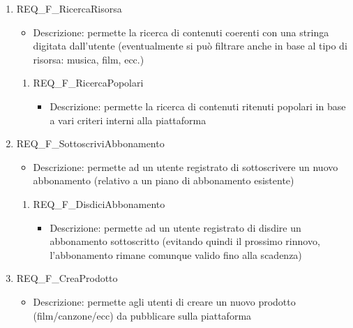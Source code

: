 \begin{enumerate}
	\item REQ\_F\_RicercaRisorsa
		\begin{itemize}	
			\item Descrizione: permette la ricerca di contenuti coerenti con una stringa digitata dall'utente (eventualmente si può filtrare anche in base al tipo di risorsa: musica, film, ecc.)
		\end{itemize}
		\begin{enumerate}[label*=\arabic*.]
			\item REQ\_F\_RicercaPopolari
			\begin{itemize}
				\item Descrizione: permette la ricerca di contenuti ritenuti popolari in base a vari criteri interni alla piattaforma 
			\end{itemize}	
		\end{enumerate}		

	\item REQ\_F\_SottoscriviAbbonamento
		\begin{itemize}	
			\item Descrizione: permette ad un utente registrato di sottoscrivere un nuovo abbonamento (relativo a un piano di abbonamento esistente)
		\end{itemize}
		\begin{enumerate}[label*=\arabic*.]			
		\item REQ\_F\_DisdiciAbbonamento
			\begin{itemize}	
				\item Descrizione: permette ad un utente registrato di disdire un abbonamento sottoscritto (evitando quindi il prossimo rinnovo, l'abbonamento rimane comunque valido fino alla scadenza)
			\end{itemize}
		\end{enumerate}
	
	
	\item REQ\_F\_CreaProdotto
	\begin{itemize}
		\item Descrizione: permette agli utenti di creare un nuovo prodotto (film/canzone/ecc) da pubblicare sulla piattaforma
	\end{itemize}
	\begin{enumerate}[label*=\arabic*.]
		

\end{enumerate}
\end{enumerate}
